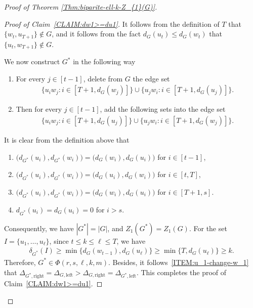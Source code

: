 \documentclass[11pt,a4paper]{article}
\begin{document}
\begin{proof}[Proof of Theorem \ref{Thm:biparite-ell-k-Z_{1}(G)}]
\begin{proof}[Proof of Claim~\ref{CLAIM:dw1>=du1}]
        It follows from the definition of $T$ that $\{w_{t}, u_{T+1}\} \not\in G$, and it follows from the fact $d_{G}(u_t) \le d_{G}(w_t)$ that $\{u_{t}, w_{T+1}\} \not\in G$. 

        We now construct $G^{\ast}$ in the following way 
        \begin{enumerate}[label=(\roman*)]
            \item For every $j \in [t-1]$, delete from $G$ the edge set 
            \begin{align*}
                \big\{u_i w_j \colon i \in [T+1, d_{G}(w_j)] \big\} \cup \big\{u_j w_i \colon i \in [T+1, d_{G}(u_j)] \big\}. 
            \end{align*}
            \item Then for every $j \in [t-1]$, add the following sets into the edge set 
            \begin{align*}
                \big\{u_i w_j \colon i \in [T+1, d_{G}(u_j)] \big\} \cup \big\{u_j w_i \colon i \in [T+1, d_{G}(w_j)] \big\}. 
            \end{align*}
        \end{enumerate}

        It is clear from the definition above that 
        \begin{enumerate}[label=(\roman*)]
            \item \label{ITEM:u_1-change-w_1} $\big( d_{G^{\ast}}(u_i), d_{G^{\ast}}(w_i) \big) = \big( d_{G}(w_i), d_{G}(u_i) \big)$ for $i \in [t-1]$, 
            \item $\big( d_{G^{\ast}}(u_i), d_{G^{\ast}}(w_i) \big) = \big( d_{G}(u_i), d_{G}(w_i) \big)$ for $i \in [t, T]$, 
            \item $\big( d_{G^{\ast}}(u_i), d_{G^{\ast}}(w_i) \big) = \big( d_{G}(w_i), d_{G}(u_i) \big)$ for $i \in [T+1, s]$. 
            \item $d_{G^{\ast}}(u_i) = d_{G}(u_i) = 0$ for $ i > s$. 
        \end{enumerate}
        Consequently, we have $|G^{\ast}| =|G|$, and $Z_{1}(G^{\ast})=Z_{1}(G)$. 
        For the set $I = \{u_1, \ldots, u_{\ell}\}$, since $t \le k \le \ell \le T$, we have 
        \begin{align*}
        \delta_{G^{\ast}}(I) 
        \ge \min\{d_{G}(w_{t-1}), d_{G}(u_{\ell})\} 
        \ge \min\{T, d_{G}(u_{\ell})\}
        \ge k. 
        \end{align*}
        Therefore, $G^{\ast} \in \Phi(r,s,\ell,k,m)$. 
        Besides, it follows~\ref{ITEM:u_1-change-w_1} that $\Delta_{G^{\ast}, \mathrm{right}} = \Delta_{G, \mathrm{left}} > \Delta_{G, \mathrm{right}} = \Delta_{G^{\ast}, \mathrm{left}}$. 
        This completes the proof of Claim~\ref{CLAIM:dw1>=du1}. 
\end{proof}%


\end{proof}
\end{document}
